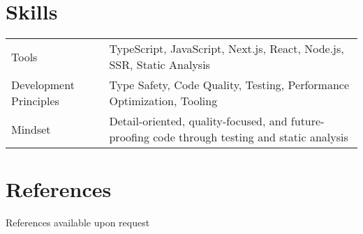 \documentclass[11pt, letterpaper]{article}
\begin{document}
\color{GoogleBlue}
\section{Skills}
\color{black}
\begin{tabularx}{\textwidth}{p{1.6in} X}
  Tools                    & TypeScript, JavaScript, Next.js, React, Node.js, SSR, Static Analysis\\[1ex]
  Development Principles   & Type Safety, Code Quality, Testing, Performance Optimization, Tooling\\[1ex]
  Mindset                  & Detail-oriented, quality-focused, and future-proofing code through testing and static analysis\\
\end{tabularx}

\color{GoogleBlue}
\section{References}
\color{black}
References available upon request
\end{document}
